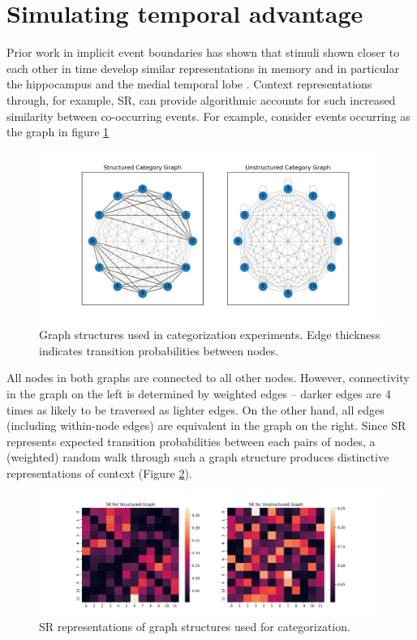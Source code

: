 \section{Simulating temporal advantage}

Prior work in implicit event boundaries has shown that stimuli shown closer to each other in time develop similar representations in memory and in particular the hippocampus and the medial temporal lobe \cite{schapiro2013neural, turk2019hippocampus, bonner2021object}. Context representations through, for example, SR, can provide algorithmic accounts for such increased similarity between co-occurring events. For example, consider events occurring as the graph in figure \ref{fig:category-graph-structures}

\begin{figure}[ht]
    \centering
    \label{fig:category-graph-structures}
    \includegraphics[width = \textwidth]{chapter_notebooks/chapter_4/figures/cat_graphs.png}
    \caption{Graph structures used in categorization experiments. Edge thickness indicates transition probabilities between nodes.}
\end{figure}

All nodes in both graphs are connected to all other nodes. However, connectivity in the graph on the left is determined by weighted edges -- darker edges are 4 times as likely to be traversed as lighter edges. On the other hand, all edges (including within-node edges) are equivalent in the graph on the right. Since SR represents expected transition probabilities between each pairs of nodes, a (weighted) random walk through such a graph structure produces distinctive representations of context (Figure \ref{fig:category-sr-sims}).

\begin{figure}
    \centering
    \label{fig:category-sr-sims}
    \includegraphics[width = \textwidth]{chapter_notebooks/chapter_4/figures/category-sr-sims.png}
    \caption{SR representations of graph structures used for categorization.}
\end{figure}

